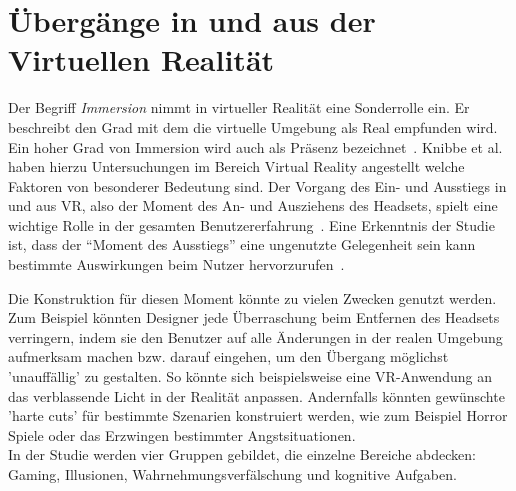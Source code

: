 \section{Übergänge in und aus der Virtuellen Realität}\label{sec:relatedWork.vr}


Der Begriff \textit{Immersion} nimmt in virtueller Realität eine Sonderrolle ein. Er beschreibt den Grad mit dem die virtuelle Umgebung als Real empfunden wird. Ein hoher Grad von Immersion wird auch als Präsenz bezeichnet~\cite{knibbe2018dream}. Knibbe et al. haben hierzu Untersuchungen im Bereich Virtual Reality angestellt welche Faktoren von besonderer Bedeutung sind.
Der Vorgang des Ein- und Ausstiegs in und aus VR, also der Moment des An- und Ausziehens des Headsets, spielt eine wichtige Rolle in der gesamten Benutzererfahrung~\cite{knibbe2018dream}. 
Eine Erkenntnis der Studie ist, dass der "`Moment des Ausstiegs"' eine ungenutzte Gelegenheit sein kann bestimmte Auswirkungen beim Nutzer hervorzurufen~\cite{knibbe2018dream}. 

Die Konstruktion für diesen Moment könnte zu vielen Zwecken genutzt werden. Zum Beispiel könnten Designer jede Überraschung beim Entfernen des Headsets verringern, indem sie den Benutzer auf alle Änderungen in der realen Umgebung aufmerksam machen bzw. darauf eingehen, um den Übergang möglichst 'unauffällig' zu gestalten. So könnte sich beispielsweise eine VR-Anwendung an das verblassende Licht in der Realität anpassen.
Andernfalls könnten gewünschte 'harte cuts' für bestimmte Szenarien konstruiert werden, wie zum Beispiel Horror Spiele oder das Erzwingen bestimmter Angstsituationen.\\
In der Studie werden vier Gruppen gebildet, die einzelne Bereiche abdecken: Gaming, Illusionen, Wahrnehmungsverfälschung und kognitive Aufgaben. \\

